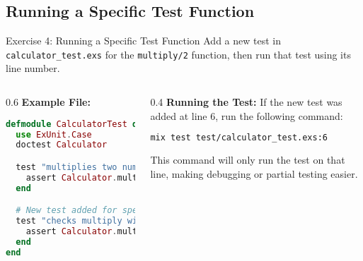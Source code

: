 \documentclass[aspectratio=169, table]{beamer}
\begin{document}
\subsection{Running a Specific Test Function}
\begin{frame}[fragile]{Exercise 4: Running a Specific Test Function}
\vspace{15pt}
Add a new test in \texttt{calculator\_test.exs} for the \texttt{multiply/2} function,  
then run that test using its line number.  

\begin{columns}
\begin{column}[t]{0.6\textwidth}
\textbf{Example File:}
\begin{lstlisting}[language=Elixir, basicstyle=\ttfamily\tiny]
defmodule CalculatorTest do
  use ExUnit.Case
  doctest Calculator

  test "multiplies two numbers" do
    assert Calculator.multiply(4, 5) == 20
  end

  # New test added for specific function
  test "checks multiply with negative numbers" do
    assert Calculator.multiply(-4, 5) == -20
  end
end
\end{lstlisting}
\end{column}

\begin{column}[t]{0.4\textwidth}
\textbf{Running the Test:}  
If the new test was added at line 6, run the following command:  

\begin{lstlisting}[language=bash]
mix test test/calculator_test.exs:6
\end{lstlisting}

This command will only run the test on that line,  
making debugging or partial testing easier.
\end{column}
\end{columns}
\end{frame}
\end{document}
